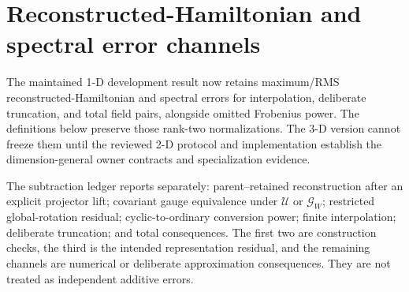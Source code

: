 \documentclass[11pt]{article}
\begin{document}
\section{Reconstructed-Hamiltonian and spectral error channels}

The maintained 1-D development result now retains maximum/RMS reconstructed-Hamiltonian
and spectral errors for interpolation, deliberate truncation, and total field pairs,
alongside omitted Frobenius power. The definitions below preserve those rank-two
normalizations. The 3-D version cannot freeze them until the reviewed 2-D protocol and
implementation establish the dimension-general owner contracts and specialization
evidence.

The subtraction ledger reports separately: parent--retained reconstruction after an
explicit projector lift; covariant gauge equivalence under $\mathcal U$ or $\mathcal
G_W$; restricted global-rotation residual; cyclic-to-ordinary conversion power; finite
interpolation; deliberate truncation; and total consequences. The first two are
construction checks, the third is the intended representation residual, and the
remaining channels are numerical or deliberate approximation consequences. They are
not treated as independent additive errors.
\end{document}
